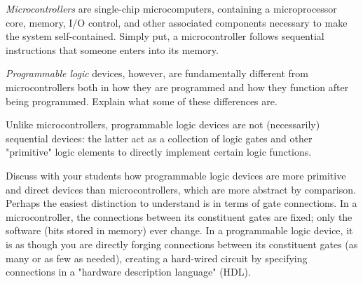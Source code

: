 

{\it Microcontrollers} are single-chip microcomputers, containing a microprocessor core, memory, I/O control, and other associated components necessary to make the system self-contained.  Simply put, a microcontroller follows sequential instructions that someone enters into its memory.

{\it Programmable logic} devices, however, are fundamentally different from microcontrollers both in how they are programmed and how they function after being programmed.  Explain what some of these differences are.







Unlike microcontrollers, programmable logic devices are not (necessarily) sequential devices: the latter act as a collection of logic gates and other "primitive" logic elements to directly implement certain logic functions.







Discuss with your students how programmable logic devices are more primitive and direct devices than microcontrollers, which are more abstract by comparison.  Perhaps the easiest distinction to understand is in terms of gate connections.  In a microcontroller, the connections between its constituent gates are fixed; only the software (bits stored in memory) ever change.  In a programmable logic device, it is as though you are directly forging connections between its constituent gates (as many or as few as needed), creating a hard-wired circuit by specifying connections in a "hardware description language" (HDL).




